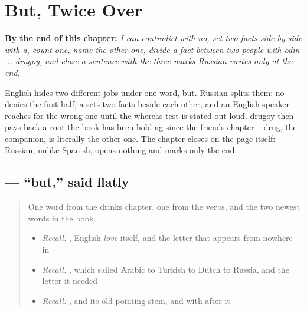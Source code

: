 
\chapter{But, Twice Over}
\label{ch:ru-but-twice-over}

\begin{chapteropening}
\textbf{By the end of this chapter:} \emph{I can contradict with no, set two facts side by side with a, count one, name the other one, divide a fact between two people with odin ... drugoy, and close a sentence with the three marks Russian writes only at the end.}

English hides two different jobs under one word, but. Russian splits them: no denies the first half, a sets two facts beside each other, and an English speaker reaches for the wrong one until the whereas test is stated out loud. drugoy then pays back a root the book has been holding since the friends chapter -- drug, the companion, is literally the other one. The chapter closes on the page itself: Russian, unlike Spanish, opens nothing and marks only the end.
\end{chapteropening}

\section[\texorpdfstring{\ru{но} (no)}{но (no)}]{ — \textquotedblleft{}but,\textquotedblright{} said flatly}

\label{lesson:RU-C17-no}



\begin{quote}
One word from the drinks chapter, one from the verbs, and the two newest words in the book.

\begin{itemize}
\raggedright
  \item \emph{Recall:} \emph{}, English \emph{love} itself, and the letter \textbf{} that appears from nowhere in \emph{ }
  \item \emph{Recall:} \emph{}, which sailed Arabic to Turkish to Dutch to Russia, and the letter \textbf{} it needed
  \item \emph{Recall:} \emph{}, and its old pointing stem, and \emph{} with \textbf{} after it
\end{itemize}
\end{quote}


